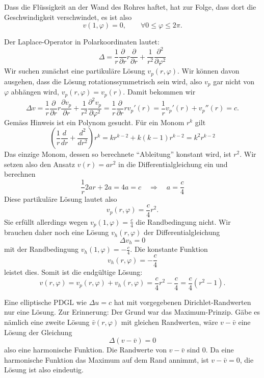\begin{loesung}
\begin{teilaufgaben}
\item Dass die Flüssigkeit an der Wand des Rohres haftet, hat zur
Folge, dass dort die Geschwindigkeit verschwindet, es ist also
\[
v(1,\varphi)=0,\qquad\forall 0\le \varphi\le 2\pi.
\]
\item Der Laplace-Operator in Polarkoordinaten lautet:
\[
\Delta
=
\frac1r\frac{\partial}{\partial r}r\frac{\partial}{\partial r}
+\frac1{r^2}\frac{\partial^2}{\partial\varphi^2}
\]
Wir suchen zunächst eine partikuläre Lösung $v_p(r,\varphi)$.
Wir können davon ausgehen, dass die Lösung rotationssymmetrisch
sein wird, also $v_p$ gar nicht von $\varphi$ abhängen wird,
$v_p(r,\varphi)=v_p(r)$. Damit bekommen wir
\[
\Delta v=
\frac1r\frac{\partial}{\partial r}r
\frac{\partial v_p}{\partial r}
+\frac1{r^2}\frac{\partial^2v_p}{\partial\varphi^2}
=
\frac1r\frac{\partial}{\partial r}rv_p'(r)
=
\frac1rv_p'(r)+v_p''(r)=c.
\]
Gemäss Hinweis ist ein Polynom gesucht. Für ein Monom $r^k$
gilt
\[
\left(\frac1r\frac{d}{dr}+\frac{d^2}{dr^2}\right)r^k
=kr^{k-2}+k(k-1)r^{k-2}
=k^2 r^{k-2}
\]
Das einzige Monom, dessen so berechnete ``Ableitung'' konstant wird, ist
$r^2$.
Wir
setzen also den Ansatz $v(r)=ar^2$
in die Differentialgleichung ein und berechnen
\[
\frac1r2ar+2a
=
4a
=c
\quad
\Rightarrow
\quad
a=\frac{c}{4}
\]
Diese partikuläre Lösung lautet also
\[
v_p(r,\varphi)=\frac{c}{4}r^2.
\]
Sie erfüllt allerdings wegen $v_p(1,\varphi)=\frac{c}{4}$ die
Randbedingung nicht. Wir brauchen daher noch eine
Lösung $v_h(r,\varphi)$ der Differentialgleichung
\[
\Delta v_h=0
\]
mit der Randbedingung $v_h(1,\varphi)=-\frac{c}{4}$. Die konstante
Funktion
\[
v_h(r,\varphi)=-\frac{c}{4}
\]
leistet dies. Somit ist die endgültige Lösung:
\[
v(r,\varphi)=v_p(r,\varphi)+v_h(r,\varphi)=\frac{c}{4}r^2 -\frac{c}{4}=
\frac{c}{4}(r^2-1).
\]
\item Eine elliptische PDGL wie $\Delta u=c$ hat mit vorgegebenen
Dirichlet-Randwerten nur eine Lösung. Zur Erinnerung: Der Grund
war das Maximum-Prinzip.
Gäbe es nämlich eine zweite Lösung $\bar v(r,\varphi)$ mit gleichen
Randwerten, wäre
$v-\bar v$ eine Lösung der Gleichung
\[
\Delta (v-\bar v)=0
\]
also eine harmonische Funktion. Die Randwerte von $v-\bar v$ sind $0$.
Da eine harmonische Funktion das Maximum auf dem Rand annimmt, ist
$v-\bar v=0$, die  Lösung ist also eindeutig.
\qedhere
\end{teilaufgaben}
\end{loesung}

